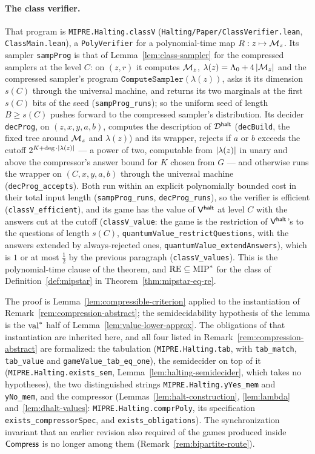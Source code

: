 \paragraph{The class verifier.} That program is \texttt{MIPRE.Halting.classV}
(\texttt{Halting/Paper/ClassVerifier.lean}, \texttt{ClassMain.lean}), a
\texttt{PolyVerifier} for a polynomial-time map $R : z \mapsto \mathcal{M}_z$. Its sampler
\texttt{sampProg} is that of Lemma~\ref{lem:class-sampler} for the compressed samplers at the
level $C$: on $(z, r)$ it computes $\mathcal{M}_z$, $\lambda(z) = \Lambda_0 +
4\left\vert {\mathcal{M}_z} \right\vert$ and the compressed sampler's program $\mathtt{ComputeSampler}(\lambda(z))$,
asks it its dimension $s(C)$ through the universal machine, and returns its two marginals at
the first $s(C)$ bits of the seed (\texttt{sampProg\_runs}); so the uniform seed of length
$B \geq s(C)$ pushes forward to the compressed sampler's distribution. Its decider
\texttt{decProg}, on $(z, x, y, a, b)$, computes the description of $\mathcal{D}^{\mathsf{halt}}$
(\texttt{decBuild}, the fixed tree around $\mathcal{M}_z$ and $\lambda(z)$) and its wrapper,
rejects if $a$ or $b$ exceeds the cutoff $2^{K + \deg \cdot \left\vert {\lambda(z)} \right\vert}$ --- a power of
two, computable from $\left\vert {\lambda(z)} \right\vert$ in unary and above the compressor's answer bound for
$K$ chosen from $G$ --- and otherwise runs the wrapper on $(C, x, y, a, b)$ through the
universal machine (\texttt{decProg\_accepts}). Both run within an explicit polynomially
bounded cost in their total input length (\texttt{sampProg\_runs}, \texttt{decProg\_runs}),
so the verifier is efficient (\texttt{classV\_efficient}), and its game has the value of
$\mathsf{V}^{\mathsf{halt}}$ at level $C$ with the answers cut at the cutoff (\texttt{classV\_value}: the game
is the restriction of $\mathsf{V}^{\mathsf{halt}}$'s to the questions of length $s(C)$,
\texttt{quantumValue\_restrictQuestions}, with the answers extended by always-rejected ones,
\texttt{quantumValue\_extendAnswers}), which is $1$ or at most $\frac12$ by the previous
paragraph (\texttt{classV\_values}). This is the polynomial-time clause of the theorem, and
$\mathrm{RE} \subseteq \mathrm{MIP}^*$ for the class of Definition~\ref{def:mipstar} in
Theorem~\ref{thm:mipstar-eq-re}.

The proof is Lemma~\ref{lem:compressible-criterion} applied to the instantiation of
Remark~\ref{rem:compression-abstract}; the semidecidability hypothesis of the lemma is the
$\mathrm{val}^*$ half of Lemma~\ref{lem:value-lower-approx}. The obligations of that
instantiation are inherited here, and all four listed in
Remark~\ref{rem:compression-abstract} are formalized: the tabulation
(\texttt{MIPRE.Halting.tab}, with \texttt{tab\_match}, \texttt{tab\_value} and
\texttt{gameValue\_tab\_eq\_one}), the semidecider on top of it
(\texttt{MIPRE.Halting.exists\_sem}, Lemma~\ref{lem:halting-semidecider}, which takes no
hypotheses), the two distinguished strings \texttt{MIPRE.Halting.yYes\_mem} and
\texttt{yNo\_mem}, and the compressor (Lemmas~\ref{lem:halt-construction},
\ref{lem:lambda} and~\ref{lem:dhalt-values}: \texttt{MIPRE.Halting.comprPoly}, its
specification \texttt{exists\_compressorSpec}, and \texttt{exists\_obligations}). The
synchronization invariant that an earlier revision also required of the games produced
inside $\mathsf{Compress}$ is no longer among them (Remark~\ref{rem:bipartite-route}).

